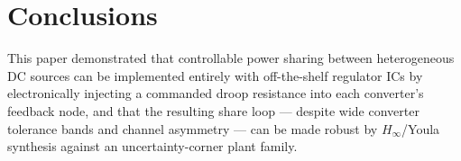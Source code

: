 \section{Conclusions}
\label{sec:conclusions}

This paper demonstrated that controllable power sharing between heterogeneous DC sources
can be implemented entirely with off-the-shelf regulator ICs by electronically injecting a
commanded droop resistance into each converter's feedback node, and that the resulting
share loop --- despite wide converter tolerance bands and channel asymmetry --- can be made
robust by $H_\infty$/Youla synthesis against an uncertainty-corner plant family.

